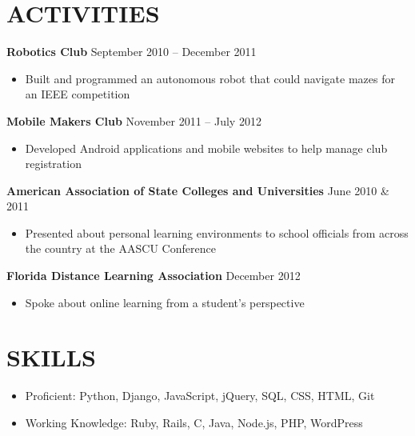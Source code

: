 \documentclass[margin]{res}
\begin{document}
\begin{resume}
\section{ACTIVITIES}             
\textbf{Robotics Club} \hfill September 2010 -- December 2011
\begin{itemize}[leftmargin=10pt]
\itemsep -2pt %
\item Built and programmed an autonomous robot that could navigate mazes for an IEEE competition
\end{itemize}

\textbf{Mobile Makers Club} \hfill November 2011 -- July 2012 
\begin{itemize}[leftmargin=10pt]
\itemsep -2pt %
\item Developed Android applications and mobile websites to help manage club registration
\end{itemize}

\textbf{American Association of State Colleges and Universities} \hfill June 2010 \& 2011
\begin{itemize}[leftmargin=10pt]
\itemsep -2pt %
\item Presented about personal learning environments to school officials from across the country at the AASCU Conference
\end{itemize}

\textbf{Florida Distance Learning Association} \hfill December 2012
\begin{itemize}[leftmargin=10pt]
\itemsep -2pt %
\item Spoke about online learning from a student's perspective
\end{itemize}

\section{SKILLS}
\begin{itemize}[leftmargin=0pt]
\item[] Proficient: Python, Django, JavaScript, jQuery, SQL, CSS, HTML, Git
\item[] Working Knowledge: Ruby, Rails, C, Java, Node.js, PHP, WordPress
\end{itemize}

\end{resume}
\end{document}
